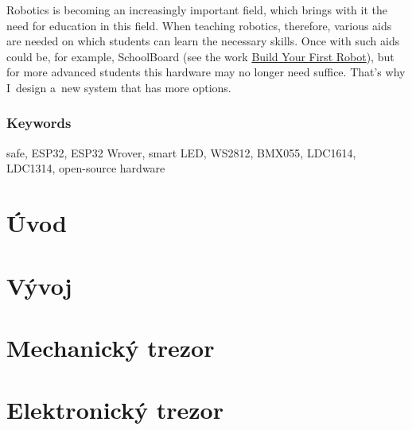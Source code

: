 \documentclass{template/socthesis}
\newcommand{\chapterm}[1]{
    
    \chapter{#1}

    \vspace{-10mm}
}
\begin{document}
Robotics is becoming an increasingly important field, which brings with it the need for education in this field.
When teaching robotics, therefore, various aids are needed on which students can learn the necessary skills. Once with such aids
could be, for example, SchoolBoard (see the work \href{https://github.com/TVavrinec/SOC-text/blob/master/SOC.pdf}{Build Your First Robot}), but for more advanced students this hardware may no 
longer need suffice. That's why I~design a~new system that has more options.

\subsection*{Keywords}
\color{black}
safe, ESP32, ESP32 Wrover, smart LED, WS2812, BMX055, LDC1614, \\ LDC1314, open-source hardware

\newpage
\pagestyle{plain}

\tableofcontents

\setcounter{figure}{0}
\setcounter{table}{0}
\newpage

\chapterm{Úvod}


\chapterm{Vývoj}
\label{E-vyvoj}






%
%
%
%

\chapterm{Mechanický trezor} 
\label{M3}


%
%

\newpage

\vspace{-50mm}

\chapterm{Elektronický trezor}
\label{E4}



\newpage

\newpage


\newpage


\newpage

\newpage

\end{document}
